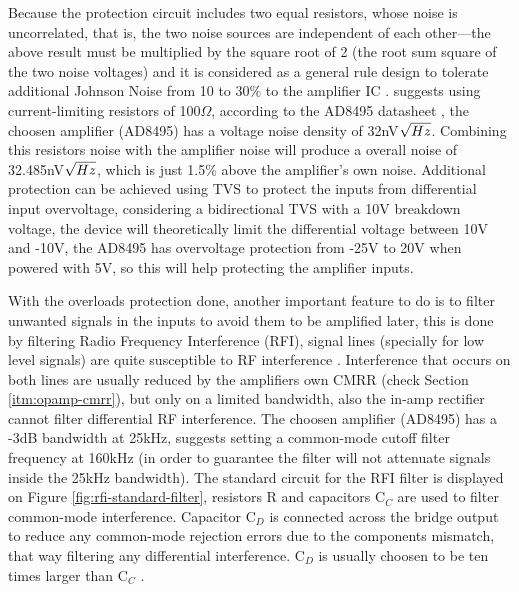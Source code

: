 	Because the protection circuit includes two equal resistors, whose noise is uncorrelated, that is, the two noise sources are independent of each other—the above result must be multiplied by the square root of 2 (the root sum square of the two noise voltages) and it is considered as a general rule design to tolerate additional Johnson Noise from 10 to 30$\%$ to the amplifier IC \cite{sensors2000}. \cite{two-ways-thermocouple} suggests using current-limiting resistors of 100$\Omega$, according to the AD8495 datasheet \cite{ad8495-datasheet}, the choosen amplifier (AD8495) has a voltage noise density of 32nV$\/ \sqrt{Hz}$. Combining this resistors noise with the amplifier noise will produce a overall noise of 32.485nV$\/\sqrt{Hz}$, which is just 1.5$\%$ above the amplifier's own noise. Additional protection can be achieved using TVS to protect the inputs from differential input overvoltage, considering a bidirectional TVS with a 10V breakdown voltage, the device will theoretically limit the differential voltage between 10V and -10V, the AD8495 has overvoltage protection from -25V to 20V when powered with 5V, so this will help protecting the amplifier inputs. 
	\par
	With the overloads protection done, another important feature to do is to filter unwanted signals in the inputs to avoid them to be amplified later, this is done by filtering Radio Frequency Interference (RFI), signal lines (specially for low level signals) are quite susceptible to RF interference \cite{analogDevDesignersGuide}. Interference that occurs on both lines are usually reduced by the amplifiers own CMRR (check Section \ref{itm:opamp-cmrr}), but only on a limited bandwidth, also the in-amp rectifier cannot filter differential RF interference. The choosen amplifier (AD8495) has a -3dB bandwidth at 25kHz, \cite{two-ways-thermocouple} suggests setting a common-mode cutoff filter frequency at 160kHz (in order to guarantee the filter will not attenuate signals inside the 25kHz bandwidth). The standard circuit for the RFI filter is displayed on Figure \ref{fig:rfi-standard-filter}, resistors R and capacitors C$_{C}$ are used to filter common-mode interference. Capacitor C$_{D}$ is connected across the bridge output to reduce any common-mode rejection errors due to the components mismatch, that way filtering any differential interference. C$_{D}$ is usually choosen to be ten times larger than C$_{C}$ \cite{ad8495-datasheet}.
	
